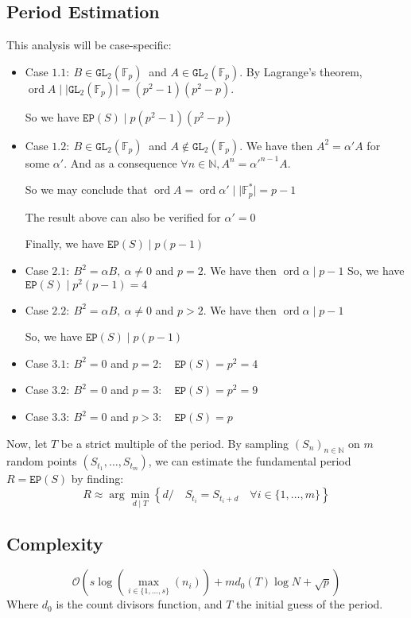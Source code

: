 \documentclass[]{article}
\DeclareMathOperator{\ord}{ord}
\begin{document}
\subsection{Period Estimation}
This analysis will be case-specific:
\begin{itemize}
	\item Case $1.1: \ B\in\mathtt{GL}_2(\mathbb{F}_p) \ $ and $A\in\mathtt{GL}_2(\mathbb{F}_p)$. By Lagrange's theorem, $\ord A  \mid  \lvert \mathtt{GL}_2(\mathbb{F}_p)\rvert=(p^2-1)(p^2-p).$  
	
	So we have $\mathtt{EP}(S) \mid p(p^2-1)(p^2-p)$
	\item Case $1.2: \ B\in\mathtt{GL}_2(\mathbb{F}_p) \ $ and $A\notin\mathtt{GL}_2(\mathbb{F}_p).$ We have then $A^2=\alpha'A$ for some $\alpha'.$ And as a consequence $\forall n\in\mathbb{N},A^n=\alpha'^{n-1}A.$
	
	So we may conclude that $\ord A = \ord \alpha' \mid \lvert \mathbb{F}_p^* \rvert = p-1$ 
	
	The result above can also be verified for $\alpha'=0$
	
	Finally, we have $\mathtt{EP}(S) \mid p(p-1)$
	\item Case $2.1: \ B^2=\alpha B, \ \alpha\neq 0 $ and $p=2.$ We have then $\ord \alpha \mid p-1$
	So, we have $\mathtt{EP}(S) \mid p^2(p-1)=4$
	\item Case $2.2: \ B^2=\alpha B, \ \alpha\neq 0 $ and $p>2.$ We have then $\ord \alpha \mid p-1$

	So, we have $\mathtt{EP}(S) \mid p(p-1)$
	\item Case $3.1: \ B^2=0$ and $p=2: \quad \mathtt{EP}(S)=p^2=4$
	\item Case $3.2: \ B^2=0$ and $p=3:\quad \mathtt{EP}(S)=p^2=9$
	\item Case $3.3: \ B^2=0$ and $p>3:\quad \mathtt{EP}(S)=p$
\end{itemize} 
Now, let $T$ be a strict multiple of the period. By sampling $(S_n)_{n\in\mathbb{N}}$ on $m$ random points $(S_{t_1},\dots,S_{t_m})$, we can estimate the fundamental period $R=\mathtt{EP}(S)$ by finding:
\begin{equation}\tag{2}
\boxed{R\approx \arg\min_{d \mid T}\left\{d/\quad S_{t_i} = S_{t_i+d} \quad \forall i\in\{1,\dots,m\}\right\}}
\end{equation}
\subsection{Complexity}
$$
\mathcal{O}\left(s\log\left(\max_{i\in\{1,\dots,s\}}(n_{i})\right)+md_0(T)\log N+ \sqrt p\right)
$$
Where $d_0$ is the count divisors function, and $T$ the initial guess of the period. 
\pagebreak
\end{document}

